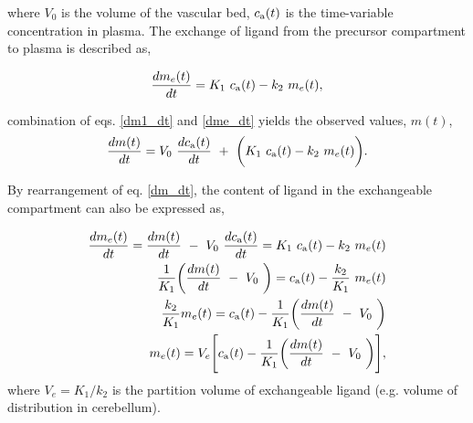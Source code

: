 \documentclass{report}
\newcommand{\ca}{c_{\rm a}(t)}
\newcommand{\1}{$_1$}
\newcommand{\2}{$_2$}
\begin{document}
\noindent
where $V_0$ is the volume of the vascular bed, $\ca$ is the time-variable concentration in plasma. The exchange of ligand from the precursor compartment to plasma is described as,

	\begin{equation}\label{dme_dt}
	\dfrac{dm_e(t)}{dt}=K_1\ \ca-k_2\ m_e(t),
	\end{equation}

\noindent
combination of eqs. \ref{dm1_dt} and \ref{dme_dt} yields the observed values, $m(t)$,
	\begin{equation}\label{dm_dt}
	\dfrac{dm(t)}{dt}=V_0\ \dfrac{d\ca}{dt} \ + \ \bigg( K_1\ \ca-k_2\ m_e(t) \bigg).
	\end{equation}
	
\noindent
By rearrangement of eq. \ref{dm_dt}, the content of ligand in the exchangeable compartment can also be expressed as, 

	\begin{align}\label{me(t)}
	\dfrac{dm_e(t)}{dt} = \dfrac{dm(t)}{dt} \ - \ V_0\ \dfrac{d\ca}{dt} = K_1\ \ca-k_2\ m_e(t)  \\ 
	\dfrac{1}{K_1}\bigg(\dfrac{dm(t)}{dt} \ - \ V_0\ \bigg)= \ca - \dfrac{k_2}{K_1} \ m_e(t) \\
	\dfrac{k_2}{K_1} m_e(t) = \ca - \dfrac{1}{K_1}\bigg(\dfrac{dm(t)}{dt} \ - \ V_0\ \bigg)	\\
	m_e(t)= V_e \Bigg[ 
	\ca - \dfrac{1}{K_1}\bigg(\dfrac{dm(t)}{dt} \ - \ V_0\ \bigg) 
	\Bigg],
	\end{align}
\noindent
where $V_e=K_1/k_2$ is the partition volume of exchangeable ligand (e.g. volume of distribution in cerebellum). 

	
	
	

\end{document}
